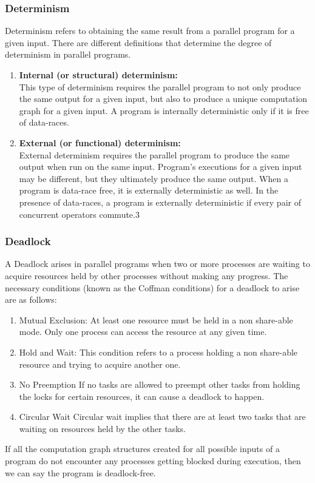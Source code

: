 \subsubsection{Determinism}
Determinism refers to obtaining the same result from a parallel program for a given input. There are different definitions that determine the degree of determinism in parallel programs.
\begin{enumerate}
\item
\textbf{Internal (or structural) determinism:\\}
This type of determinism requires the parallel program to not only produce the same output for a given input, but also to produce a unique computation graph for a given input. A program is internally deterministic only if it is free of data-races.
\item
\textbf{External (or functional) determinism:\\}
External determinism requires the parallel program to produce the same output when run on the same input. Program's executions for a given input may be different, but they ultimately produce the same output. When a program is data-race free, it is externally deterministic as well. In the presence of data-races, a program is externally deterministic if every pair of concurrent operators commute.3
\end{enumerate}
\subsubsection{Deadlock}
A Deadlock arises in parallel programs when two or more processes are waiting to acquire resources held by other processes without making any progress. The necessary conditions (known as the Coffman conditions) for a deadlock to arise are as follows:
\begin{enumerate}
\item 
{Mutual Exclusion:} At least one resource must be held in a non share-able mode. Only one process can access the resource at any given time. 
\item
{Hold and Wait:} This condition refers to a process holding a non share-able resource and trying to acquire another one.
\item
{No Preemption}
If no tasks are allowed to preempt other tasks from holding the locks for certain resources, it can cause a deadlock to happen.
\item
{Circular Wait} Circular wait implies that there are at least two tasks that are waiting on resources held by the other tasks.
\end{enumerate}
If all the computation graph structures created for all possible inputs of a program do not encounter any processes getting blocked during execution, then we can say the program is deadlock-free.
